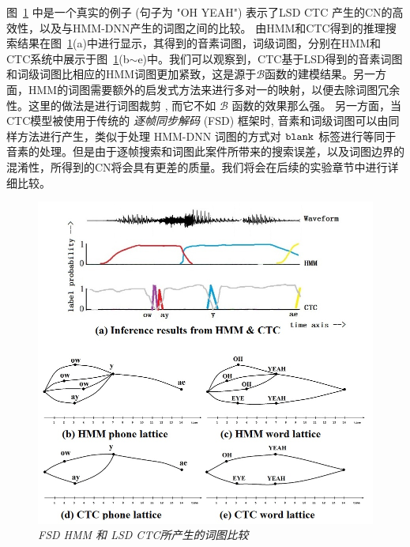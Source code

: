图~\ref{fig:lat-exp} 中是一个真实的例子 (句子为 "OH YEAH") 表示了LSD CTC 产生的CN的高效性，以及与HMM-DNN产生的词图之间的比较。
由HMM和CTC得到的推理搜索结果在图~\ref{fig:lat-exp}(a)中进行显示，其得到的音素词图，词级词图，分别在HMM和CTC系统中展示于图~\ref{fig:lat-exp}(b$\sim$e)中。我们可以观察到，CTC基于LSD得到的音素词图和词级词图比相应的HMM词图更加紧致，这是源于$\mathcal{B}$函数的建模结果。另一方面，HMM的词图需要额外的启发式方法来进行多对一的映射，以便去除词图冗余性。这里的做法是进行词图裁剪 \cite{siniscalchi2013bottom}, 而它不如 $\mathcal{B}$ 函数的效果那么强。
另一方面，当CTC模型被使用于传统的 {\em 逐帧同步解码} (FSD) 框架时, 音素和词级词图可以由同样方法进行产生\cite{povey2012generating}，类似于处理 HMM-DNN 词图的方式对 $\tt blank$ 标签进行等同于音素的处理。但是由于逐帧搜索和词图此案件所带来的搜索误差，以及词图边界的混淆性，所得到的CN将会具有更差的质量。我们将会在后续的实验章节中进行详细比较。

%


\begin{figure}[tbhp!]
        \centering
        \includegraphics[width=0.95\linewidth]{figure/lat-exp.jpg}
        \caption{{\it FSD HMM 和 LSD CTC所产生的词图比较}}
        \label{fig:lat-exp}
      \end{figure}

